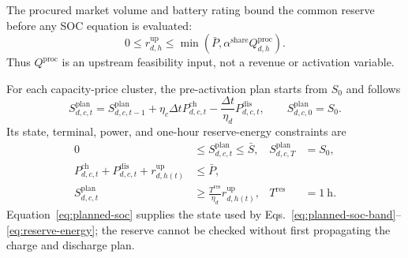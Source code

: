 \documentclass[11pt,a4paper]{article}
\begin{document}
The procured market volume and battery rating bound the common reserve before
any SOC equation is evaluated:
\begin{equation}
  0\leq r^{\mathrm{up}}_{d,h}
  \leq \min\!\left(
  \bar P,\alpha^{\mathrm{share}}Q^{\mathrm{proc}}_{d,h}
  \right).
  \label{eq:reserve-cap}
\end{equation}
Thus $Q^{\mathrm{proc}}$ is an upstream feasibility input, not a revenue or
activation variable.

For each capacity-price cluster, the pre-activation plan starts from $S_0$ and
follows
\begin{equation}
  S^{\mathrm{plan}}_{d,c,t}
  =S^{\mathrm{plan}}_{d,c,t-1}
  +\eta_c\Delta t P^{\mathrm{ch}}_{d,c,t}
  -\frac{\Delta t}{\eta_d}P^{\mathrm{dis}}_{d,c,t},
  \qquad S^{\mathrm{plan}}_{d,c,0}=S_0.
  \label{eq:planned-soc}
\end{equation}
Its state, terminal, power, and one-hour reserve-energy constraints are
\begin{align}
  0&\leq S^{\mathrm{plan}}_{d,c,t}\leq\bar S,
  &S^{\mathrm{plan}}_{d,c,T}&=S_0,
  \label{eq:planned-soc-band}\\
  P^{\mathrm{ch}}_{d,c,t}+P^{\mathrm{dis}}_{d,c,t}
  +r^{\mathrm{up}}_{d,h(t)}&\leq\bar P,
  \label{eq:planned-power}\\
  S^{\mathrm{plan}}_{d,c,t}
  &\geq\frac{T^{\mathrm{res}}}{\eta_d}r^{\mathrm{up}}_{d,h(t)},
  &T^{\mathrm{res}}&=1\ \mathrm{h}.
  \label{eq:reserve-energy}
\end{align}
Equation~\eqref{eq:planned-soc} supplies the state used by
Eqs.~\eqref{eq:planned-soc-band}--\eqref{eq:reserve-energy}; the reserve cannot
be checked without first propagating the charge and discharge plan.
\end{document}
